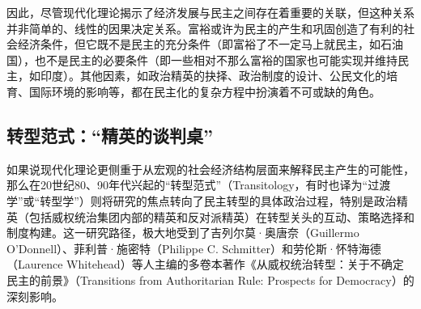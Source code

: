 \documentclass[UTF8, 10pt]{ctexbook}
\begin{document}
\begin{itemize}
\begin{itemize}
    \end{itemize}
    因此，尽管现代化理论揭示了经济发展与民主之间存在着重要的关联，但这种关系并非简单的、线性的因果决定关系。富裕或许为民主的产生和巩固创造了有利的社会经济条件，但它既不是民主的充分条件（即富裕了不一定马上就民主，如石油国），也不是民主的必要条件（即一些相对不那么富裕的国家也可能实现并维持民主，如印度）。其他因素，如政治精英的抉择、政治制度的设计、公民文化的培育、国际环境的影响等，都在民主化的复杂方程中扮演着不可或缺的角色。
\end{itemize}

\subsection{转型范式：“精英的谈判桌”}
如果说现代化理论更侧重于从宏观的社会经济结构层面来解释民主产生的可能性，那么在20世纪80、90年代兴起的“转型范式”（Transitology，有时也译为“过渡学”或“转型学”）则将研究的焦点转向了民主转型的具体政治过程，特别是政治精英（包括威权统治集团内部的精英和反对派精英）在转型关头的互动、策略选择和制度构建。这一研究路径，极大地受到了吉列尔莫·奥唐奈（Guillermo O'Donnell）、菲利普·施密特（Philippe C. Schmitter）和劳伦斯·怀特海德（Laurence Whitehead）等人主编的多卷本著作《从威权统治转型：关于不确定民主的前景》（Transitions from Authoritarian Rule: Prospects for Democracy）的深刻影响。
\end{document}
